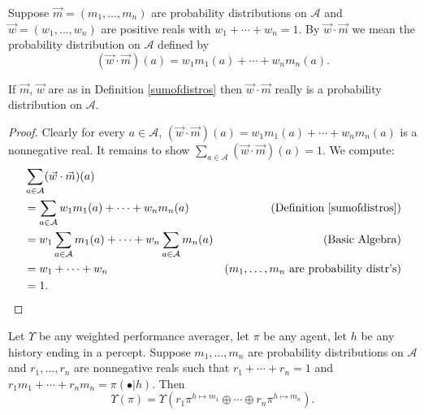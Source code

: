 \documentclass[runningheads]{llncs}
\begin{document}
\begin{definition}
\label{sumofdistros}
    Suppose $\vec m=(m_1,\ldots,m_n)$ are probability distributions on $\mathcal A$
    and $\vec w=(w_1,\ldots,w_n)$ are positive reals with
    $w_1+\cdots+w_n=1$. By $\vec w\cdot\vec m$ we mean the probability distribution
    on $\mathcal A$ defined by
    \[
        (\vec w\cdot\vec m)(a) = w_1m_1(a) + \cdots + w_nm_n(a).
    \]
\end{definition}

\begin{lemma}
    If $\vec m$, $\vec w$ are as in Definition \ref{sumofdistros}
    then $\vec w\cdot\vec m$ really is a probability distribution on $\mathcal A$.
\end{lemma}

\begin{proof}
    Clearly for every $a\in\mathcal A$,
    $(\vec w\cdot\vec m)(a) = w_1m_1(a) + \cdots + w_nm_n(a)$ is a nonnegative
    real. It remains to show $\sum_{a\in\mathcal A}(\vec w\cdot\vec m)(a)=1$.
    We compute:
    \begin{align*}
        &{} \sum_{a\in\mathcal A}(\vec w\cdot\vec m)(a)\\
        &=
        \sum_{a\in\mathcal A} w_1m_1(a) + \cdots + w_nm_n(a)
            &\mbox{(Definition \ref{sumofdistros})}\\
        &=
        w_1\sum_{a\in\mathcal A} m_1(a) + \cdots + w_n\sum_{a\in\mathcal A}m_n(a)
            &\mbox{(Basic Algebra)}\\
        &= w_1 + \cdots + w_n
            &\mbox{($m_1,\ldots,m_n$ are probability distr's)}\\
        &= 1.
    \end{align*}
\end{proof}

\begin{proposition}
\label{longproposition}
    Let $\Upsilon$ be any weighted performance averager, let $\pi$ be any agent,
    let $h$ be any history ending in a percept.
    Suppose $m_1,\ldots,m_n$ are probability distributions on $\mathcal A$
    and $r_1,\ldots,r_n$ are nonnegative reals such that $r_1+\cdots+r_n=1$
    and $r_1m_1+\cdots+r_nm_n=\pi(\bullet|h)$.
    Then
    \[
        \Upsilon(\pi)
        =
        \Upsilon(r_1\pi^{h\mapsto m_1} \oplus \cdots \oplus r_n\pi^{h\mapsto m_n}).
    \]
\end{proposition}
\end{document}
